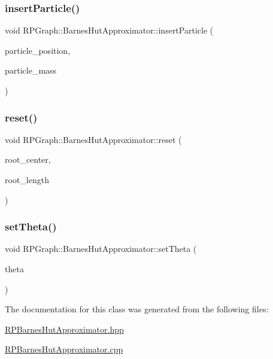 \subsubsection{\texorpdfstring{insert\+Particle()}{insertParticle()}}
{\footnotesize\ttfamily void R\+P\+Graph\+::\+Barnes\+Hut\+Approximator\+::insert\+Particle (\begin{DoxyParamCaption}\item[{\mbox{\hyperlink{classRPGraph_1_1Coordinate}{R\+P\+Graph\+::\+Coordinate}}}]{particle\+\_\+position,  }\item[{float}]{particle\+\_\+mass }\end{DoxyParamCaption})}

\mbox{\label{classRPGraph_1_1BarnesHutApproximator_ae05dc350ca9e9cc89eb2263f39c9e0bd}} 
\subsubsection{\texorpdfstring{reset()}{reset()}}
{\footnotesize\ttfamily void R\+P\+Graph\+::\+Barnes\+Hut\+Approximator\+::reset (\begin{DoxyParamCaption}\item[{\mbox{\hyperlink{classRPGraph_1_1Coordinate}{Coordinate}}}]{root\+\_\+center,  }\item[{float}]{root\+\_\+length }\end{DoxyParamCaption})}

\mbox{\label{classRPGraph_1_1BarnesHutApproximator_a49d72989a8357ba4be81945c919b70ea}} 
\subsubsection{\texorpdfstring{set\+Theta()}{setTheta()}}
{\footnotesize\ttfamily void R\+P\+Graph\+::\+Barnes\+Hut\+Approximator\+::set\+Theta (\begin{DoxyParamCaption}\item[{float}]{theta }\end{DoxyParamCaption})}



The documentation for this class was generated from the following files\+:\begin{DoxyCompactItemize}
\item 
\mbox{\hyperlink{RPBarnesHutApproximator_8hpp}{R\+P\+Barnes\+Hut\+Approximator.\+hpp}}\item 
\mbox{\hyperlink{RPBarnesHutApproximator_8cpp}{R\+P\+Barnes\+Hut\+Approximator.\+cpp}}\end{DoxyCompactItemize}
